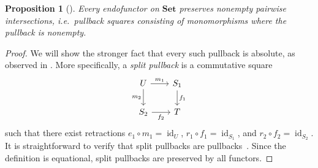 \documentclass[11pt, oneside, article]{memoir}
\theoremstyle{plain}
\newtheorem{proposition}[theorem]{Proposition}
\theoremstyle{definition}
\theoremstyle{remark}
\DeclareMathOperator{\id}{id}
\newcommand{\namedcat}[1]{\mathbf{#1}}
\newcommand{\Set}{\namedcat{Set}}
\newcommand{\xS}{S}
\newcommand{\xT}{T}
\newcommand{\xU}{U}
\begin{document}
\begin{proposition}[\cite{trnkova}]\label{prop:trnkova}
  Every endofunctor on $\Set$ preserves nonempty pairwise
  intersections, i.e.\ pullback squares consisting of monomorphisms
  where the pullback is nonempty.
\end{proposition}
\begin{proof}
  We will show the stronger fact that every such pullback is absolute,
  as observed in \cite{manes:classes}. More specifically, a
  \emph{split pullback} is a commutative square
  \[\begin{tikzcd}[column sep=20]
      \xU & {\xS_1} \\
      {\xS_2} & \xT
      \arrow["{m_1}", from=1-1, to=1-2]
      \arrow["{m_2}"', from=1-1, to=2-1]
      \arrow["{f_1}", from=1-2, to=2-2]
      \arrow["{f_2}"', from=2-1, to=2-2]
    \end{tikzcd}
  \]
  such that there exist retractions $e_1 \circ m_1 = \id_\xU$,
  $r_1 \circ f_1 = \id_{\xS_1}$, and $r_2 \circ f_2 = \id_{\xS_2}$. It is
  straightforward to verify that split pullbacks are
  pullbacks~\cite[Lemma 1.8(4)]{manes:classes}. Since the definition
  is equational, split pullbacks are preserved by all functors.



\end{proof}
\end{document}
